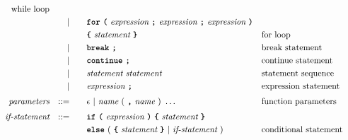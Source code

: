 \begin{alignat*}{9}
                                                           && \textrm{while loop}\\
&&                       && |   &\quad && \textbf{\texttt{for}}\  
                                   \textbf{\texttt{(}}\  \textit{expression} \
                                   \textbf{\texttt{;}} \  \textit{expression} \
                                   \textbf{\texttt{;}} \  \textit{expression} \
                                   \textbf{\texttt{)}}\\
&&                       &&     &      && \textbf{\texttt{\{}}\  \textit{statement}   \ \textbf{\texttt{\}}} 
                                                           && \textrm{for loop}\\
&&                       && |   &\quad && \textbf{\texttt{break}}\ \textbf{\texttt{;}}
                                                           && \textrm{break statement}\\
&&                       && |   &\quad && \textbf{\texttt{continue}}\ \textbf{\texttt{;}}
                                                           && \textrm{continue statement}\\
&&                       && |   &\quad &&  \textit{statement} \ 
                                    \textit{statement}     && \textrm{statement sequence} \\
&&                       && |   &\quad &&  \textit{expression} \ \textbf{\texttt{;}}
                                                           && \textrm{expression statement} \\[1mm] 
&& \textit{parameters}   && ::= &\quad &&  \epsilon\ | \  \textit{name} \ 
                                                   (\ \textbf{\texttt{,}} \ \textit{name}\ )\ \ldots
                                                            && \textrm{function parameters}   \\[1mm]
&& \textit{if-statement} && ::= &\quad &&  \textbf{\texttt{if}}\
                                   \textbf{\texttt{(}}\ \textit{expression} \ \textbf{\texttt{)}}\ 
                                   \textbf{\texttt{\{}}\ \textit{statement} \ \textbf{\texttt{\}}}\\
&&                       &&     &      && \textbf{\texttt{else}}\
                                          (\ \textbf{\texttt{\{}}\ \textit{statement}\ \textbf{\texttt{\}}}
                                          \ | \
                                          \textit{if-statement} \ )
                                                            && \textrm{conditional statement}   \\[1mm]

\end{alignat*}
